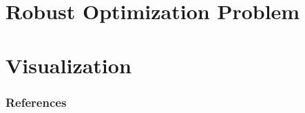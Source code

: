 \documentclass{beamer}
\begin{document}

\section{Robust Optimization Problem}






\section{Visualization}






\begin{frame}[allowframebreaks]
\frametitle{References}
\nocite{*}


\end{frame}
\end{document}
